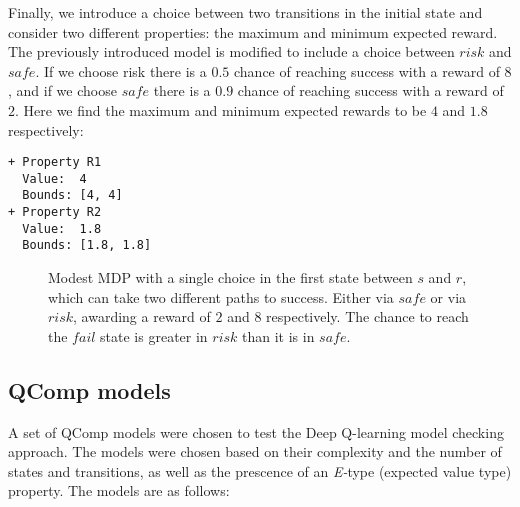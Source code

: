 Finally, we introduce a choice between two transitions in the initial state and consider two different properties: the maximum and minimum expected reward. The previously introduced model is modified to include a choice between $risk$ and $safe$. If we choose risk there is a $0.5$ chance of reaching success with a reward of $8$, and if we choose $safe$ there is a $0.9$ chance of reaching success with a reward of $2$. Here we find the maximum and minimum expected rewards to be $4$ and $1.8$ respectively:
\begin{verbatim}
+ Property R1
  Value:  4
  Bounds: [4, 4]
+ Property R2
  Value:  1.8
  Bounds: [1.8, 1.8]
\end{verbatim}

\begin{figure}[H]
    \centering
    \caption{Modest MDP with a single choice in the first state between $s$ and $r$, which can take two different paths to success. Either via $safe$ or via $risk$, awarding a reward of $2$ and $8$ respectively. The chance to reach the $fail$ state is greater in $risk$ than it is in $safe$.}
    \label{fig:safe-risk-mdp}
\end{figure}

\subsection{QComp models}

A set of QComp models were chosen to test the Deep Q-learning model checking approach. The models were chosen based on their complexity and the number of states and transitions, as well as the prescence of an \emph{E-}type (expected value type) property. The models are as follows:

